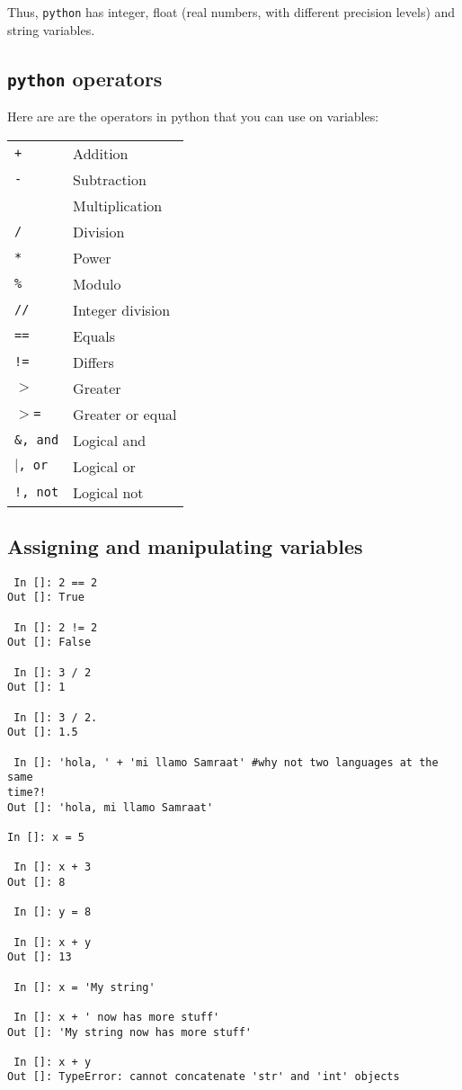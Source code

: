 Thus, {\tt python} has integer, float (real numbers, with different 
precision levels) and string variables.

\subsection{{\tt python} operators}
Here are are the operators in python that you can use on variables:

\begin{tabular}{p{2cm} p{10cm}} 
  {\tt +} & Addition\\
  {\tt -} & Subtraction\\
  {\tt *} & Multiplication\\
  {\tt /} & Division\\
  {\tt **} & Power\\
  {\tt \%} & Modulo\\
  {\tt //} & Integer division\\
  {\tt ==} & Equals\\
  {\tt !=} & Differs\\
  {\tt $>$} & Greater\\
  {\tt $>$=} & Greater or equal\\
  {\tt \&, and} & Logical and\\
  {\tt $\vert$, or} & Logical or\\
  {\tt !, not} & Logical not\\	
\end{tabular}

\subsection{Assigning and manipulating variables}

\begin{lstlisting}
 In []: 2 == 2
Out []: True

 In []: 2 != 2
Out []: False

 In []: 3 / 2
Out []: 1

 In []: 3 / 2.
Out []: 1.5

 In []: 'hola, ' + 'mi llamo Samraat' #why not two languages at the same
time?! 
Out []: 'hola, mi llamo Samraat'

In []: x = 5

 In []: x + 3
Out []: 8

 In []: y = 8

 In []: x + y
Out []: 13

 In []: x = 'My string'

 In []: x + ' now has more stuff'
Out []: 'My string now has more stuff'

 In []: x + y
Out []: TypeError: cannot concatenate 'str' and 'int' objects
\end{lstlisting}

